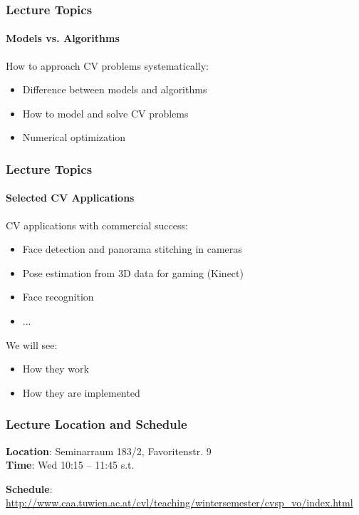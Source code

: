 \documentclass[xetex]{beamer}
\begin{document}

\begin{frame}
\frametitle{Lecture Topics}
\framesubtitle{Models vs. Algorithms}

How to approach CV problems systematically:
\begin{itemize}
	\item Difference between models and algorithms
	\item How to model and solve CV problems
	\item Numerical optimization
\end{itemize}

\end{frame}


\begin{frame}
\frametitle{Lecture Topics}
\framesubtitle{Selected CV Applications}

CV applications with commercial success:
\begin{itemize}
	\item Face detection and panorama stitching in cameras
	\item Pose estimation from 3D data for gaming (Kinect)
	\item Face recognition
	\item ...
\end{itemize}

\bigskip
We will see:
\begin{itemize}
	\item How they work
	\item How they are implemented
\end{itemize}

\end{frame}


\begin{frame}
\frametitle{Lecture Location and Schedule}

\textbf{Location}: Seminarraum 183/2, Favoritenstr. 9\\
\textbf{Time}: Wed 10:15 -- 11:45 s.t.

\bigskip
\textbf{Schedule}: \url{http://www.caa.tuwien.ac.at/cvl/teaching/wintersemester/cvsp_vo/index.html}

\end{frame}
\end{document}
